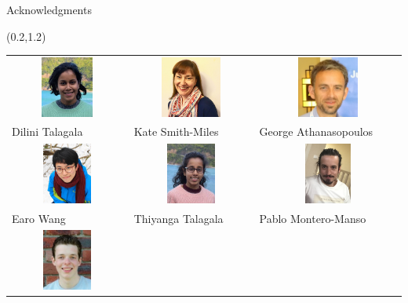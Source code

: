 \documentclass[14pt,ignorenonframetext,]{beamer}
\begin{document}
\begin{frame}{Acknowledgments}
\protect\hypertarget{acknowledgments}{}

\begin{textblock}{12.5}(0.2,1.2)
\begin{block}{}\fontsize{9}{10}\sf
\centering\begin{tabular}{p{3.4cm}p{3.4cm}p{3.5cm}}
\includegraphics[height=2cm, width=10cm, keepaspectratio]{dilini} &
\includegraphics[height=2cm, width=10cm, keepaspectratio]{kate} &
\includegraphics[height=2cm, width=10cm, keepaspectratio]{george}\\
Dilini Talagala  & Kate Smith-Miles & George Athanasopoulos \\
\includegraphics[height=2cm, width=10cm, keepaspectratio]{earowang} &
\includegraphics[height=2cm, width=10cm, keepaspectratio]{thiyanga} &
\includegraphics[height=2cm, width=10cm, keepaspectratio]{pablo}\\
Earo Wang & Thiyanga Talagala & Pablo Montero-Manso\\
\includegraphics[height=2cm, width=10cm, keepaspectratio]{mitch} &

\end{tabular}
\end{block}
\end{textblock}
\end{frame}
\end{document}
